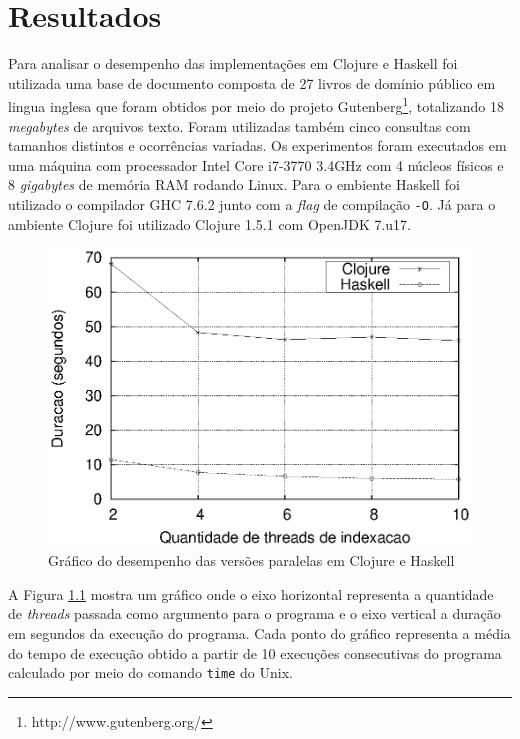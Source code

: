 \chapter{Resultados}

Para analisar o desempenho das implementações em Clojure e Haskell foi utilizada uma base de documento composta de 27 livros de domínio público em lingua inglesa que foram obtidos por meio do projeto Gutenberg\footnote{http://www.gutenberg.org/}, totalizando 18 \emph{megabytes} de arquivos texto. Foram utilizadas também cinco consultas com tamanhos distintos e ocorrências variadas. Os experimentos foram executados em uma máquina com processador Intel Core i7-3770 3.4GHz com 4 núcleos físicos e 8 \emph{gigabytes} de memória RAM rodando Linux. Para o embiente Haskell foi utilizado o compilador GHC 7.6.2 junto com a \emph{flag} de compilação \verb|-O|. Já para o ambiente Clojure foi utilizado Clojure 1.5.1 com OpenJDK 7.u17.

\begin{figure}[h]
 \centering
 \includegraphics[scale=0.85]{imagens/clojure-haskell.eps}
 \caption{Gráfico do desempenho das versões paralelas em Clojure e Haskell}
 \label{fig:clj-hs-comp}
\end{figure}

A Figura \ref{fig:clj-hs-comp} mostra um gráfico onde o eixo horizontal representa a quantidade de \emph{threads} passada como argumento para o programa e o eixo vertical a duração em segundos da execução do programa. Cada ponto do gráfico representa a média do tempo de execução obtido a partir de 10 execuções consecutivas do programa calculado por meio do comando \verb|time| do Unix.


